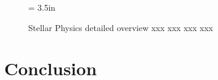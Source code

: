 \documentclass{article}[12pt]
\def\filler{xxxx xxxx xxxx xxxx xxxx xxxx xxxx xxxx xxxx xxxx xxxx xxxx
xxxx xxxx xxxx xxxx xxxx xxxx xxxx xxxx xxxx xxxx xxxx xxxx
xxxx xxxx xxxx xxxx xxxx xxxx xxxx xxxx xxxx xxxx xxxx xxxx
xxxx xxxx xxxx xxxx xxxx xxxx xxxx xxxx xxxx xxxx xxxx xxxx
xxxx xxxx xxxx xxxx xxxx xxxx xxxx xxxx xxxx xxxx xxxx xxxx
xxxx xxxx xxxx xxxx xxxx xxxx xxxx xxxx xxxx xxxx xxxx xxxx
xxxx xxxx xxxx xxxx xxxx xxxx xxxx xxxx xxxx xxxx xxxx xxxx
xxxx xxxx xxxx xxxx xxxx xxxx xxxx xxxx xxxx xxxx xxxx xxxx}
\def\filler{}
\begin{document}
\begin{figure}[htb]
\begin{center}
\epsfxsize = 3.5in
\caption
{Stellar Physics detailed overview xxx xxx xxx xxx}
\label{fig:sp2}
\end{center}
\end{figure}

\clearpage

\filler

\subsection{}

\filler

\subsection{}

\filler

\subsection{}

\filler

\clearpage
\newpage

\section{Conclusion}

\filler

\subsection{}

\filler

\subsection{}

\filler
\end{document}
